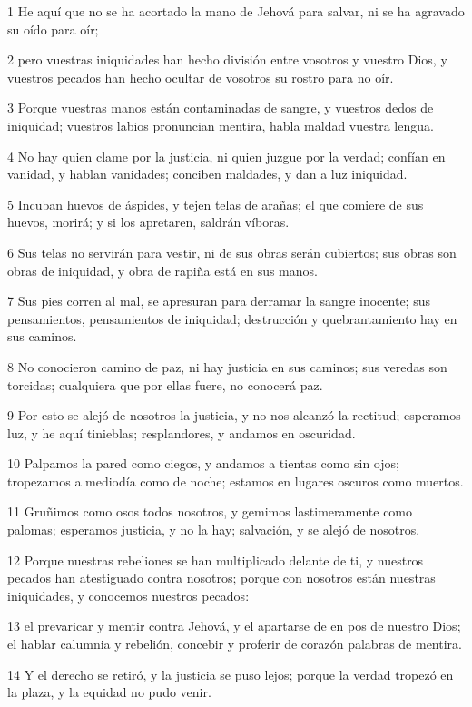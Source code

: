 \par 1 He aquí que no se ha acortado la mano de Jehová para salvar, ni se ha agravado su oído para oír;
\par 2 pero vuestras iniquidades han hecho división entre vosotros y vuestro Dios, y vuestros pecados han hecho ocultar de vosotros su rostro para no oír.
\par 3 Porque vuestras manos están contaminadas de sangre, y vuestros dedos de iniquidad; vuestros labios pronuncian mentira, habla maldad vuestra lengua.
\par 4 No hay quien clame por la justicia, ni quien juzgue por la verdad; confían en vanidad, y hablan vanidades; conciben maldades, y dan a luz iniquidad.
\par 5 Incuban huevos de áspides, y tejen telas de arañas; el que comiere de sus huevos, morirá; y si los apretaren, saldrán víboras.
\par 6 Sus telas no servirán para vestir, ni de sus obras serán cubiertos; sus obras son obras de iniquidad, y obra de rapiña está en sus manos.
\par 7 Sus pies corren al mal, se apresuran para derramar la sangre inocente; sus pensamientos, pensamientos de iniquidad; destrucción y quebrantamiento hay en sus caminos.
\par 8 No conocieron camino de paz, ni hay justicia en sus caminos; sus veredas son torcidas; cualquiera que por ellas fuere, no conocerá paz.
\par 9 Por esto se alejó de nosotros la justicia, y no nos alcanzó la rectitud; esperamos luz, y he aquí tinieblas; resplandores, y andamos en oscuridad.
\par 10 Palpamos la pared como ciegos, y andamos a tientas como sin ojos; tropezamos a mediodía como de noche; estamos en lugares oscuros como muertos.
\par 11 Gruñimos como osos todos nosotros, y gemimos lastimeramente como palomas; esperamos justicia, y no la hay; salvación, y se alejó de nosotros.
\par 12 Porque nuestras rebeliones se han multiplicado delante de ti, y nuestros pecados han atestiguado contra nosotros; porque con nosotros están nuestras iniquidades, y conocemos nuestros pecados:
\par 13 el prevaricar y mentir contra Jehová, y el apartarse de en pos de nuestro Dios; el hablar calumnia y rebelión, concebir y proferir de corazón palabras de mentira.
\par 14 Y el derecho se retiró, y la justicia se puso lejos; porque la verdad tropezó en la plaza, y la equidad no pudo venir.
